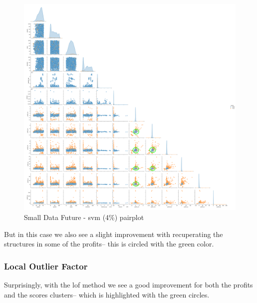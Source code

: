 \documentclass[11pt,english,a4paper,hidelinks]{book}
\begin{document}
\begin{figure}[H]
    \centering
    \includegraphics[width=1\textwidth]{images/code/outliers/Small Data future - SVM.png}
    \caption{Small Data Future - \acrshort{svm} (4\%) \acrshort{pairplot}}
    \label{fig:small_data_future_svm}
\end{figure}

\noindent But in this case we also see a slight improvement with recuperating the structures in some of the profits--  this is circled with the green color.

\newpage
\subsubsection{Local Outlier Factor}

\noindent Surprisingly, with the \acrshort{lof} method we see a good improvement for both the profits and the scores clusters-- which is highlighted with the green circles.
\end{document}
